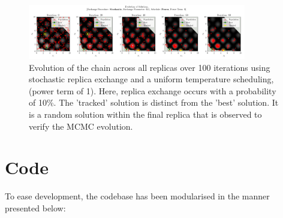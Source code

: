 \documentclass[10pt]{article}
\begin{document}
\begin{figure}[H]
    \centering
    \includegraphics[width=0.85\textwidth]{../figures/KBF/100_iters/Stochastic/Power/0.1_1_Solutions.png}
    \captionsetup{justification=centering}
    \caption{Evolution of the chain across all replicas over 100 iterations using stochastic replica exchange and a uniform temperature scheduling, (power term of 1). Here, replica exchange occurs with a probability of 10\%.  The 'tracked' solution is distinct from the 'best' solution. It is a random solution within the final replica that is observed to verify the MCMC evolution.}
    \label{fig:StochasticApp}
\end{figure}
\vspace{-3.5mm}
\section{Code}
\label{sec:code}

To ease development, the codebase has been modularised in the manner presented below:
\end{document}
